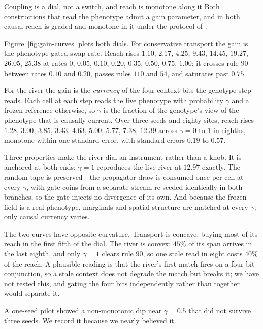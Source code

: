 \begin{empiricalfinding}[label={find:gain}]{Coupling is a dial, not a switch, and reach is monotone along it}
Both constructions that read the phenotype admit a gain parameter, and in both
causal reach is graded and monotone in it under the protocol of
.

Figure~\ref{fig:gain-curves} plots both dials.
For conservative transport the gain is the phenotype-gated swap rate. Reach
rises $1.10$, $2.17$, $4.25$, $9.43$, $14.45$, $19.27$, $26.05$, $25.38$ at
rates $0$, $0.05$, $0.10$, $0.20$, $0.35$, $0.50$, $0.75$, $1.00$: it crosses
rule $90$ between rates $0.10$ and $0.20$, passes rules $110$ and $54$, and
saturates past $0.75$.

For the river the gain is the \emph{currency} of the four context bits the
genotype step reads. Each cell at each step reads the live phenotype with
probability $\gamma$ and a frozen reference otherwise, so $\gamma$ is the
fraction of the genotype's view of the phenotype that is causally current. Over
three seeds and eighty sites, reach rises $1.28$, $3.00$, $3.85$, $3.43$,
$4.63$, $5.00$, $5.77$, $7.38$, $12.39$ across $\gamma = 0$ to $1$ in eighths,
monotone within one standard error, with standard errors $0.19$ to $0.57$.

Three properties make the river dial an instrument rather than a knob. It is
anchored at both ends: $\gamma = 1$ reproduces the live river at $12.97$
exactly. The random tape is preserved---the propagator draw is consumed once per
cell at every $\gamma$, with gate coins from a separate stream re-seeded
identically in both branches, so the gate injects no divergence of its own. And
because the frozen field is a real phenotype, marginals and spatial structure
are matched at every $\gamma$; only causal currency varies.

The two curves have opposite curvature. Transport is concave, buying most of its
reach in the first fifth of the dial. The river is convex: $45$\% of its span
arrives in the last eighth, and only $\gamma = 1$ clears rule $90$, so one stale
read in eight costs $40$\% of the reach. A plausible reading is that the river's
first-match fires on a four-bit conjunction, so a stale context does not degrade
the match but breaks it; we have not tested this, and gating the four bits
independently rather than together would separate it.

A one-seed pilot showed a non-monotonic dip near $\gamma = 0.5$ that did not
survive three seeds. We record it because we nearly believed it.
\end{empiricalfinding}

